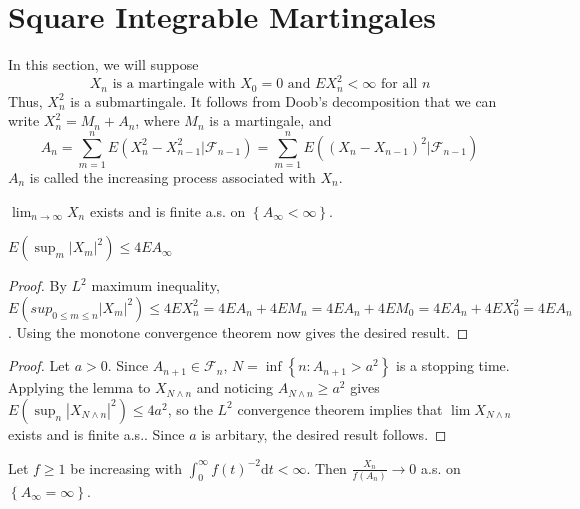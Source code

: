 \section{Square Integrable Martingales}
In this section, we will suppose \[X_n \text{ is a martingale with }X_0=0 \text{ and } EX_n^2<\infty \text{ for all } n\]
Thus, $X_n^2$ is a submartingale. It follows from Doob's decomposition that we can write $X_n^2=M_n+A_n$, where $M_n$ is a martingale, and \[A_n=\sum_{m=1}^nE(X_n^2-X_{n-1}^2|\mathcal{F}_{n-1})=\sum_{m=1}^nE((X_n-X_{n-1})^2|\mathcal{F}_{n-1})\]
$A_n$ is called the increasing process associated with $X_n$.
\begin{theorem}
$\lim_{n\to\infty}X_n$ exists and is finite a.s. on $\left\{A_\infty<\infty\right\}$.
\end{theorem}
\begin{lemma}
$E(\sup_m\left|X_m\right|^2)\le 4EA_\infty$
\end{lemma}
\begin{proof}
By $L^2$ maximum inequality, $E(sup_{0\le m\le n}\left|X_m\right|^2)\le 4EX_n^2=4EA_n+4EM_n=4EA_n+4EM_0=4EA_n+4EX_0^2=4EA_n$. Using the monotone convergence theorem now gives the desired result.
\end{proof}
\begin{proof}
Let $a>0$. Since $A_{n+1}\in \mathcal{F}_n$, $N=\inf\left\{n:A_{n+1}>a^2\right\}$ is a stopping time. Applying the lemma to $X_{N\wedge n}$ and noticing $A_{N\wedge n}\geq a^2$ gives $E(\sup_n\left|X_{N\wedge n}\right|^2)\le 4a^2$, so the $L^2$ convergence theorem implies that $\lim X_{N\wedge n}$ exists and is finite a.s.. Since $a$ is arbitary, the desired result follows.
\end{proof}
\begin{theorem}
Let $f\geq 1$ be increasing with $\int_0^\infty f(t)^{-2}\mathrm{d}t<\infty$. Then $\frac{X_n}{f(A_n)}\to 0$ a.s. on $\left\{A_\infty=\infty\right\}$.
\end{theorem}


